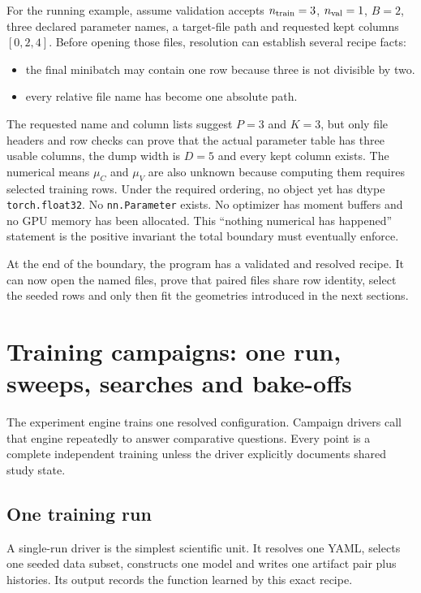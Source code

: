 \documentclass[10pt,aps,prd,twocolumn,nofootinbib]{revtex4-2}
\newcommand{\code}[1]{\texttt{#1}}
\begin{document}
For the running example, assume validation accepts $n_{\rm train}=3$,
$n_{\rm val}=1$, $B=2$, three declared parameter names, a target-file path
and requested kept columns $[0,2,4]$.  Before opening those files, resolution
can establish several recipe facts:
\begin{itemize}
  \item the final minibatch may contain one row because three is not divisible
        by two.
  \item every relative file name has become one absolute path.
\end{itemize}
The requested name and column lists suggest $P=3$ and $K=3$, but only file
headers and row checks can prove that the actual parameter table has three
usable columns, the dump width is $D=5$ and every kept column exists.  The
numerical means $\mu_C$ and $\mu_V$ are also unknown because computing them
requires selected training rows.  Under the required ordering, no object yet
has dtype \code{torch.float32}.  No \code{nn.Parameter} exists.  No optimizer
has moment buffers and no GPU memory has been allocated.  This ``nothing
numerical has happened'' statement is the positive invariant the total
boundary must eventually enforce.

At the end of the boundary, the program has a validated and resolved recipe.
It can now open the named files, prove that paired files share row identity,
select the seeded rows and only then fit the geometries introduced in the
next sections.

\section{Training campaigns: one run, sweeps, searches and bake-offs}
\label{sec:campaigns}

The experiment engine trains one resolved configuration.  Campaign drivers
call that engine repeatedly to answer comparative questions.  Every point is a
complete independent training unless the driver explicitly documents shared
study state.

\subsection{One training run}

A single-run driver is the simplest scientific unit.  It resolves one YAML,
selects one seeded data subset, constructs one model and writes one artifact
pair plus histories.  Its output records the function learned by this exact
recipe.
\end{document}

